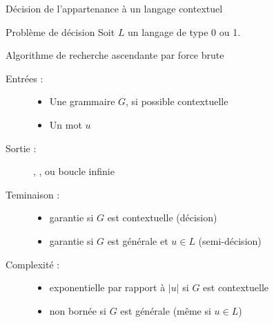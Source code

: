 
\begingroup

\begin{frame}{Décision de l'appartenance à un langage contextuel}

  \vspace{-1mm}
  \begin{block}{Problème de décision}
    Soit $L$ un langage de type 0 ou 1.
    
  \end{block}

  \vspace{-2mm}
  \begin{block}{Algorithme de recherche ascendante par force brute} 
  \vspace{-1mm}

    \begin{description}
    \item [Entrées :]
      \begin{itemize}
      \item Une grammaire $G$, si possible contextuelle
      \item Un mot $u$
      \end{itemize}
    \item [Sortie :] , , ou \alert{boucle infinie}
    \item [Teminaison :] 
      \begin{itemize}
      \item garantie si $G$ est contextuelle (décision)
      \item garantie si $G$ est générale et $u \in L$ (semi-décision)
      \end{itemize}
    \item [Complexité :] 
      \begin{itemize}
      \item exponentielle par rapport à $|u|$ si $G$ est contextuelle
      \item non bornée si $G$ est générale (même si $u \in L$)
      \end{itemize}
    \end{description}
  \end{block}
  
\end{frame}

\endgroup
\endinput
